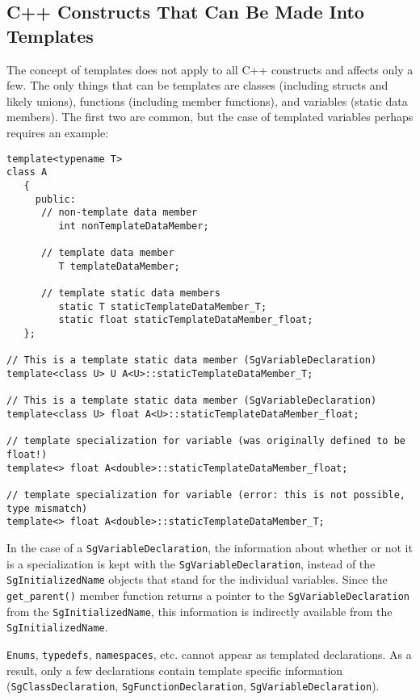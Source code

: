 \subsection{C++ Constructs That Can Be Made Into Templates}
   The concept of templates does not apply to all C++ constructs and affects only a few.
The only things that can be templates are classes (including structs and likely unions),
functions (including member functions), and variables (static data
members).  The first two are common, but the case of templated variables perhaps requires 
an example:

{\indent
{\mySmallFontSize

\begin{verbatim}
template<typename T>
class A
   {
     public:
      // non-template data member
         int nonTemplateDataMember;

      // template data member
         T templateDataMember;

      // template static data members
         static T staticTemplateDataMember_T;
         static float staticTemplateDataMember_float;
   };
         
// This is a template static data member (SgVariableDeclaration)
template<class U> U A<U>::staticTemplateDataMember_T;

// This is a template static data member (SgVariableDeclaration)
template<class U> float A<U>::staticTemplateDataMember_float;

// template specialization for variable (was originally defined to be float!)
template<> float A<double>::staticTemplateDataMember_float;

// template specialization for variable (error: this is not possible, type mismatch)
template<> float A<double>::staticTemplateDataMember_T;
\end{verbatim}
}}

   In the case of a {\tt SgVariableDeclaration}, the information about whether or not it is a specialization
is kept with the {\tt SgVariableDeclaration}, instead of the {\tt SgInitializedName} objects that
stand for the individual variables.  Since the {\tt get\_parent()} member function returns
a pointer to the {\tt SgVariableDeclaration} from the {\tt SgInitializedName}, this
information is indirectly available from the {\tt SgInitializedName}.

  {\tt Enums}, {\tt typedefs}, {\tt namespaces}, etc. cannot appear as templated declarations.
As a result, only a few declarations contain template specific information
({\tt SgClassDeclaration}, {\tt SgFunctionDeclaration}, {\tt SgVariableDeclaration}).

